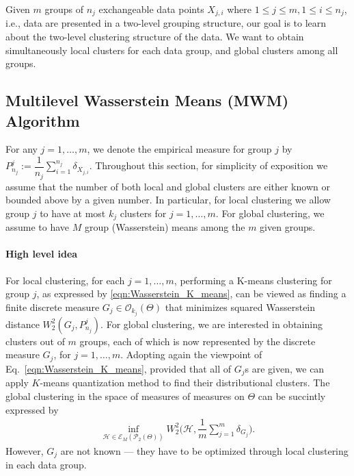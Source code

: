 Given $m$ groups of $n_{j}$ exchangeable data points $X_{j,i}$ where $1 
\leq j \leq m, 1 \leq i \leq n_{j}$, i.e., data are presented in a two-level grouping structure, 
our goal is to learn about the two-level clustering structure of the data. We want
to obtain simultaneously local clusters for each data group, and global clusters among all groups. 

\subsection{Multilevel Wasserstein Means (MWM) Algorithm} \label{Section:multilevel_kmeans}
For any $j=1,\ldots, m$, we denote the empirical measure for group $j$ by $P_{n_{j}}
^{j}:=\dfrac{1}{n_{j}}\sum \limits_{i=1}^{n_{j}}{\delta_{X_{j,i}}}$. Throughout 
this section, for simplicity of exposition we assume that the number of 
both local and global clusters are either known or bounded above by a given number. In 
particular, for local clustering we allow group $j$ to have at most $k_{j}$ clusters 
for $j=1,\ldots, m$. For global clustering, we assume to have $M$ group (Wasserstein) means
among the $m$ given groups.

\paragraph{High level idea}
For local clustering, for each $j = 1,\ldots, m$,
performing a K-means clustering for group $j$, as expressed by
\eqref{eqn:Wasserstein_K_means}, can be viewed as finding a finite discrete measure $G_{j} 
\in \mathcal{O}_{k_{j}}(\Theta)$ that minimizes squared Wasserstein distance $W_{2}^{2}
(G_{j},P_{n_{j}}^{j})$. For global clustering, we are interested in 
obtaining clusters out of $m$ groups, each of which is now represented by the
discrete measure $G_j$, for $j=1,\ldots,m$. 
Adopting again the viewpoint of Eq.~\eqref{eqn:Wasserstein_K_means}, 
provided that all of $G_{j}$s are given, we can apply $K$-means quantization method 
to find their distributional clusters. The global clustering in the
space of measures of measures on $\Theta$ can be succintly expressed by
\vspace{-6pt}
\begin{eqnarray}
\mathop {\inf }\limits_{\mathcal{H} \in \mathcal{E}_{M}(\mathcal{P}_{2}(\Theta))}{W_{2}^{2}\biggr(
\mathcal{H},\dfrac{1}{m}\sum \limits_{j=1}^{m}{\delta_{G_{j}}}\biggr)}. \nonumber
\end{eqnarray}
%
However, $G_{j}$ are not known --- they have to be optimized through local clustering in 
each data group.
